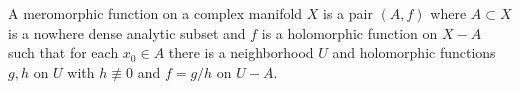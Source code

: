 A meromorphic function on a complex manifold $X$ is a pair $(A, f)$ where $A \subset X$ is a nowhere dense analytic subset and $f$ is a holomorphic function on $X - A$ such that for each $x_0 \in A$ there is a neighborhood $U$ and holomorphic functions $g, h$ on $U$ with $h \not\equiv 0$ and $f = g/h$ on $U - A$.

